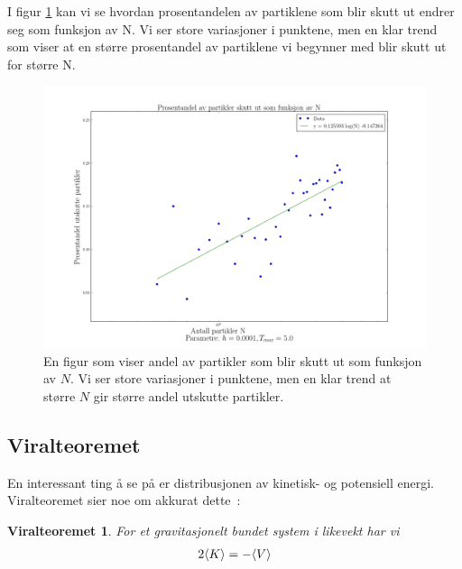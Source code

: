 \documentclass[11pt]{article}
\newtheorem*{viralthm}{Viralteoremet}
\begin{document}
\begin{multicols}{2}

I figur \ref{fig:prosentandel-utskutte} kan vi se hvordan prosentandelen
av partiklene som blir skutt ut endrer seg som funksjon av N. Vi ser
store variasjoner i punktene, men en klar trend som viser at en større
prosentandel av partiklene vi begynner med blir skutt ut for større N. 

\end{multicols}
\begin{figure}[ht!]
  \centering
  \includegraphics[width=\textwidth]{../fig/prosentandel.png}
  \caption{\label{fig:prosentandel-utskutte} En figur som viser andel av partikler
  som blir skutt ut som funksjon av $N$. Vi ser store variasjoner i punktene, men en klar
  trend at større $N$ gir større andel utskutte partikler.}
\end{figure}
\begin{multicols}{2}



\subsection{Viralteoremet}
En interessant ting å se på er distribusjonen av kinetisk- og
potensiell energi. Viralteoremet sier noe om akkurat dette~\cite{viralteoremet-wiki}:

\begin{viralthm}
  For et gravitasjonelt bundet system i likevekt har vi 
\begin{align}
  2\langle K \rangle = -\langle V \rangle
\end{align}
\end{viralthm} 

\end{multicols}
\end{document}
